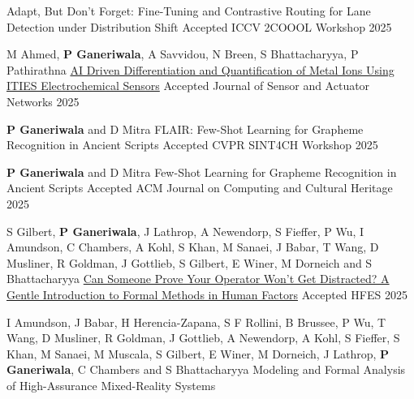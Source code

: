 \begin{cventries}
{
Adapt, But Don’t Forget: Fine-Tuning and Contrastive Routing for Lane Detection under Distribution Shift}
{Accepted}
{ICCV 2COOOL Workshop 2025} 
{ %
\begin{cvitems}
\end{cvitems}
}
\cventry
{M Ahmed, \textbf{P Ganeriwala}, A Savvidou, N
Breen, S Bhattacharyya, P Pathirathna}
{
\href{https://www.mdpi.com/2224-2708/14/4/70}{AI Driven Differentiation and Quantification of Metal Ions Using ITIES Electrochemical Sensors}}
{Accepted}
{Journal of Sensor and Actuator Networks 2025} 
{ %
\begin{cvitems}
\end{cvitems}
}
\cventry
{\textbf{P Ganeriwala} and D Mitra}
{	
FLAIR: Few-Shot Learning for Grapheme Recognition in Ancient Scripts}
{Accepted}
{CVPR SINT4CH Workshop 2025} 
{ %
\begin{cvitems}
\end{cvitems}
}
\cventry
{\textbf{P Ganeriwala} and D Mitra}
{	
Few-Shot Learning for Grapheme Recognition in Ancient Scripts}
{Accepted}
{ACM Journal on Computing and Cultural Heritage 2025} 
{ %
\begin{cvitems}
\end{cvitems}
}
\cventry
{S Gilbert, \textbf{P Ganeriwala}, J Lathrop, A Newendorp, S Fieffer, P Wu, I Amundson, C Chambers, A Kohl,  S Khan, M Sanaei, J Babar, T Wang, D Musliner, R Goldman, J Gottlieb, S Gilbert, E Winer, M Dorneich and S Bhattacharyya}
{\href{https://journals.sagepub.com/doi/full/10.1177/10711813251369496}{Can Someone Prove Your Operator Won’t Get Distracted? A Gentle Introduction to Formal Methods in Human Factors}}
{Accepted}
{HFES 2025} 
{ %
\begin{cvitems}
\end{cvitems}
}
\cventry
{I Amundson, J Babar, H Herencia-Zapana, S F Rollini, B Brussee, P Wu, T Wang, D Musliner, R Goldman, J Gottlieb, A Newendorp, A Kohl, S Fieffer, S Khan, M Sanaei, M Muscala, S Gilbert, E Winer, M Dorneich, J Lathrop, \textbf{P Ganeriwala}, C Chambers and S Bhattacharyya}
{Modeling and Formal Analysis of High-Assurance Mixed-Reality Systems}

\end{cventries}
